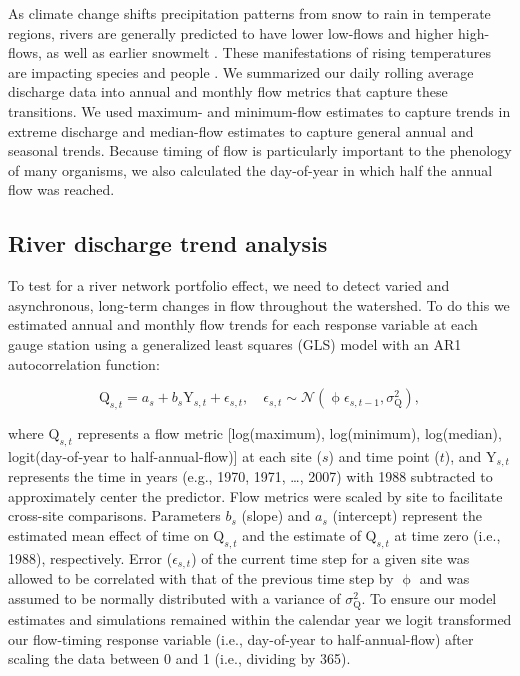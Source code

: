 \documentclass[draft,linenumbers]{AGUJournal}
\begin{document}
	As climate change shifts precipitation patterns from snow to rain in temperate regions, rivers are generally predicted to have lower low-flows and higher high-flows, as well as earlier snowmelt \citep{Nijssen:2001}. These manifestations of rising temperatures are impacting species \citep{Xenopoulos:2006} and people \citep{Hirabayashi:2013}. We summarized our daily rolling average discharge data into annual and monthly flow metrics that capture these transitions. We used maximum- and minimum-flow estimates to capture trends in extreme discharge and median-flow estimates to capture general annual and seasonal trends. Because timing of flow is particularly important to the phenology of many organisms, we also calculated the day-of-year in which half the annual flow was reached. 

\subsection{River discharge trend analysis}

To test for a river network portfolio effect, we need to detect varied and asynchronous, long-term changes in flow throughout the watershed. To do this we estimated annual and monthly flow trends for each response variable at each gauge station using a generalized least squares (GLS) model with an AR1 autocorrelation function:
\begin{linenomath*}
\begin{equation}
  \mathrm{Q}_{s,t} = a_s + b_s \mathrm{Y}_{s,t} + \epsilon_{s,t}, \quad 
  \epsilon_{s,t} \sim \mathcal{N}(\upphi \epsilon_{s,t-1}, \sigma_\mathrm{Q}^2) \label{eq1},
\end{equation}
\end{linenomath*}
where $\mathrm{Q}_{s,t}$ represents a flow metric [log(maximum), log(minimum), log(median), logit(day-of-year to half-annual-flow)] at each site ($s$) and time point ($t$), and $\mathrm{Y}_{s,t}$ represents the time in years (e.g., 1970, 1971, \ldots, 2007) with 1988 subtracted to approximately center the predictor. Flow metrics were scaled by site to facilitate cross-site comparisons. Parameters $b_{s}$ (slope) and $a_{s}$ (intercept) represent the estimated mean effect of time on $\mathrm{Q}_{s,t}$ and the estimate of $\mathrm{Q}_{s,t}$ at time zero (i.e., 1988), respectively. Error ($\epsilon_{s,t}$) of the current time step for a given site was allowed to be correlated with that of the previous time step by $\upphi$ and was assumed to be normally distributed with a variance of $\sigma_\mathrm{Q}^{2}$. To ensure our model estimates and simulations remained within the calendar year we logit transformed our flow-timing response variable (i.e., day-of-year to half-annual-flow) after scaling the data between 0 and 1 (i.e., dividing by 365).
\end{document}
